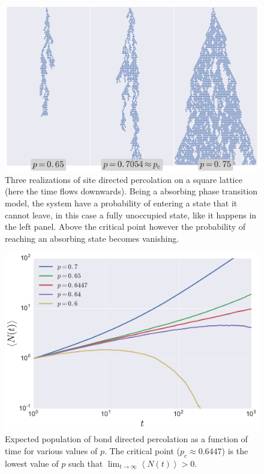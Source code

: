 \begin{figure}
\begin{center}
    \includegraphics[scale=0.5]{chapters/ch5-anis/figs/dperco}
\end{center}
\caption{Three realizations of site directed percolation on a square lattice
    (here the time flows downwards). Being a absorbing phase transition model,
    the system have a probability of entering a state that it cannot leave, in
    this case a fully unoccupied state, like it happens in the left panel.
    Above the critical point however the probability of reaching an absorbing
    state becomes vanishing.}
\label{fig:dperco}
\end{figure}

\begin{figure}
\begin{center}
    \includegraphics[scale=0.5]{chapters/ch5-anis/figs/dperco_nt}
\end{center}
\caption{Expected population of bond directed percolation as a function of time
    for various values of $p$. The critical point ($p_c\approx0.6447$) is the
    lowest value of $p$ such that $\lim_{t\rightarrow\infty}\left\langle
    N(t)\right\rangle>0$.}
\label{fig:dperco_nt}
\end{figure}


